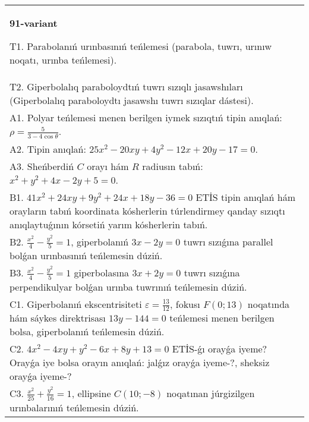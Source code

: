 \documentclass{article}
\begin{document}
\begin{tabular}{m{17cm}}
\textbf{91-variant}
\newline

T1. Parabolanıń urınbasınıń teńlemesi (parabola, tuwrı, urınıw noqatı, urınba teńlemesi).\\

T2. Giperbolalıq paraboloydtıń tuwrı sızıqlı jasawshıları (Giperbolalıq paraboloydtı jasawshı tuwrı sızıqlar dástesi).\\

A1. Polyar teńlemesi menen berilgen iymek sızıqtıń tipin anıqlań: $\rho=\frac{5}{3-4\cos\theta}$.\\

A2. Tipin anıqlań: $25 x^{2}-20 xy+4 y^{2}-12 x+20 y-17=0$.\\

A3. Sheńberdiń $C$ orayı hám $R$ radiusın tabıń: $x^2+y^2+4 x-2 y+5=0$.\\

B1. $41x^{2} + 24xy + 9y^{2} + 24x + 18y - 36 = 0$ ETİS tipin anıqlań hám orayların tabıń koordinata kósherlerin túrlendirmey qanday sızıqtı anıqlaytuǵının kórsetiń yarım kósherlerin tabıń.  \\

B2. $\frac{x^{2}}{4} - \frac{y^{2}}{5} = 1$, giperbolanıń $3x - 2y = 0$ tuwrı sızıǵına parallel bolǵan urınbasınıń teńlemesin dúziń.  \\

B3. $\frac{x^{2}}{4} - \frac{y^{2}}{5} = 1$ giperbolasına $3x + 2y = 0$ tuwrı sızıǵına perpendikulyar bolǵan urınba tuwrınıń teńlemesin dúziń.\\

C1. Giperbolanıń ekscentrisiteti $\varepsilon = \frac{13}{12}$, fokusı $F(0;13)$ noqatında hám sáykes direktrisası $13y - 144 = 0$ teńlemesi menen berilgen bolsa, giperbolanıń teńlemesin dúziń.  \\

C2. $4x^{2} - 4xy + y^{2} - 6x + 8y + 13 = 0$ ETİS-ǵı orayǵa iyeme? Orayǵa iye bolsa orayın anıqlań: jalǵız orayǵa iyeme-?, sheksiz orayǵa iyeme-?  \\

C3. $\frac{x^{2}}{25} + \frac{y^{2}}{16} = 1$, ellipsine $C(10; - 8)$ noqatınan júrgizilgen urınbalarınıń teńlemesin dúziń.  \\

\end{tabular}
\vspace{1cm}
\end{document}
